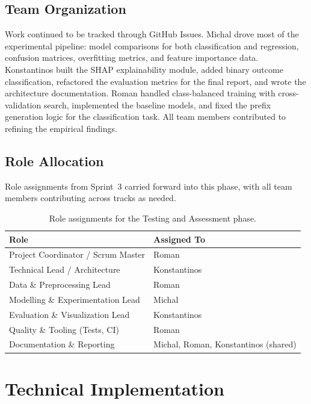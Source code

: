 \documentclass[runningheads]{llncs}
\begin{document}
\subsection{Team Organization}
Work continued to be tracked through GitHub Issues. Michal drove most of the
experimental pipeline: model comparisons for both classification and regression,
confusion matrices, overfitting metrics, and feature importance data.
Konstantinos built the SHAP explainability module, added binary outcome
classification, refactored the evaluation metrics for the final report, and wrote the
architecture documentation. Roman handled class-balanced training with
cross-validation search, implemented the baseline models, and fixed the prefix generation
logic for the classification task. All team members contributed to refining the empirical
findings.

\subsection{Role Allocation}
Role assignments from Sprint~3 carried forward into this phase, with all team members
contributing across tracks as needed.

\begin{table}[H]
    \caption{Role assignments for the Testing and Assessment phase.}\label{tab:roles}
    \centering
    \begin{tabular}{@{}ll@{}}
        \toprule
        \textbf{Role}                      & \textbf{Assigned To} \\
        \midrule
        Project Coordinator / Scrum Master & Roman                \\
        Technical Lead / Architecture      & Konstantinos         \\
        Data \& Preprocessing Lead         & Roman                \\
        Modelling \& Experimentation Lead  & Michal               \\
        Evaluation \& Visualization Lead   & Konstantinos         \\
        Quality \& Tooling (Tests, CI)     & Roman                \\
        Documentation \& Reporting         & Michal, Roman, Konstantinos (shared) \\
        \bottomrule
    \end{tabular}
\end{table}

\section{Technical Implementation}
\end{document}
